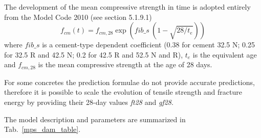 \documentclass[a4paper]{article}
\newcommand{\param}[1]{{\it #1}}
\begin{document}
The development of the mean compressive strength in time is adopted
entirely from the Model Code 2010 (see section 5.1.9.1)
\begin{equation}
f_{cm}(t) = f_{cm,28} \exp{\left( fib\_s \: \left( 1 - \sqrt{28/t_e} \right) \right) }
\label{fcm}
\end{equation}
where $fib\_s$ is a cement-type dependent coefficient (0.38 for cement 32.5 N; 0.25 for 32.5 R and 42.5 N; 0.2 for 42.5 R and 52.5 N and R), $t_e$ is the equivalent age and $f_{cm,28}$ is the mean compressive strength at the age of 28 days. 

For some concretes the prediction formulae do not provide accurate predictions, therefore it is possible to scale the evolution of tensile strength and fracture energy by providing their 28-day values \param{ft28} and \param{gf28}. 

The model description and parameters are summarized in Tab.~\ref{mps_dam_table}.
\end{document}
